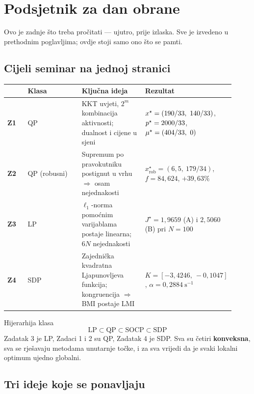 \chapter{Podsjetnik za dan obrane}
\label{ch:podsjetnik}

Ovo je zadnje što treba pročitati --- ujutro, prije izlaska. Sve je izvedeno u
prethodnim poglavljima; ovdje stoji samo ono što se pamti.

\section{Cijeli seminar na jednoj stranici}
\label{sec:pod-pregled}

\begin{longtable}{@{}p{0.09\linewidth} p{0.24\linewidth} p{0.28\linewidth} p{0.31\linewidth}@{}}
\toprule
& \textbf{Klasa} & \textbf{Ključna ideja} & \textbf{Rezultat} \\
\midrule
\endhead
\textbf{Z1} & QP & KKT uvjeti, $2^m$ kombinacija aktivnosti; dualnost i cijene u
sjeni & $x^{\star} = (190/33,\ 140/33)$, $p^{\star} = 2000/33$, $\muopt = (404/33,\ 0)$ \\[6pt]
\textbf{Z2} & QP (robusni) & Supremum po pravokutniku postignut u vrhu $\Rightarrow$
osam nejednakosti & $x_{\mathrm{rob}}^{\star} = (6{,}5,\ 179/34)$,
$f = 84{,}624$, $+39{,}63\%$ \\[6pt]
\textbf{Z3} & LP & $\ell_1$-norma pomoćnim varijablama postaje linearna;
$6N$ nejednakosti & $J^{\star} = 1{,}9659$ (A) i $2{,}5060$ (B) pri $N = 100$ \\[6pt]
\textbf{Z4} & SDP & Zajednička kvadratna Ljapunovljeva funkcija; kongruencija
$\Rightarrow$ BMI postaje LMI & $K = [-3{,}4246,\ -0{,}1047]$,
$\alpha = 0{,}2884\ \mathrm{s}^{-1}$ \\
\bottomrule
\end{longtable}

\begin{pojam}{Hijerarhija klasa}
\begin{equation}
\text{LP} \subset \text{QP} \subset \text{SOCP} \subset \text{SDP}
\end{equation}
Zadatak 3 je LP, Zadaci 1 i 2 su QP, Zadatak 4 je SDP. Sva su četiri
\textbf{konveksna}, sva se rješavaju metodama unutarnje točke, i za sva vrijedi da
je svaki lokalni optimum ujedno globalni.
\end{pojam}

\section{Tri ideje koje se ponavljaju}
\label{sec:pod-ideje}

